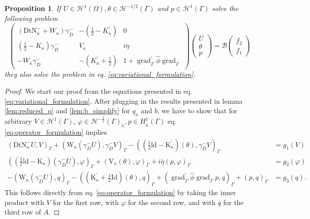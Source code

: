 \documentclass[12pt,journal,compsoc, onecolumn]{IEEEtran}
\newtheorem{proposition}[theorem]{Proposition}
\begin{document}
\begin{proposition}
\label{prop:operator_formulation}
If \(U \in \mathcal{H}^{1}(\Omega), \theta \in \mathcal{H}^{-1 / 2}(\Gamma)\) and \(p \in \mathcal{H}^{1}(\Gamma)\) solve the following problem 
    \begin{equation}
    \label{eq:operator_formulation}
        \begin{pmatrix}
            (\mathrm{DtN}_{ \kappa}^{-} + W_{ \kappa}) \gamma_D^- & - (\frac{1}{2} - K^\prime_{ \kappa}) & 0 \\
            (\frac{1}{2} - K_{ \kappa})\gamma_D^- & V_{ \kappa} & i \overline{\eta} \\
            - W_{ \kappa}\gamma_D^- & - (K^\prime_{ \kappa} + \frac{1}{2}) & 1 + \operatorname{grad}_{\Gamma}^\prime \hat{\phi}\operatorname{grad}_{\Gamma} 
        \end{pmatrix}
        \begin{pmatrix}
            U \\ \theta\\ p 
        \end{pmatrix}
        = \mathcal{B}\begin{pmatrix}
            f_2 \\ f_1
        \end{pmatrix}
    \end{equation}
    they also solve the problem in eq. \ref{eq:variational_formulation}.
\end{proposition}
\begin{proof}
    We start our proof from the equations presented in eq. \ref{eq:variational_formulation}. After plugging in the results presented in lemma \ref{lem:reduced_q} and \ref{lem:b_simplify} for $q_\kappa$ and $b$, we have to show that for arbitrary $V \in \mathcal{H}^1(\Gamma)$, $\varphi \in \mathcal{H}^{-\frac{1}{2}}(\Gamma)_{\tilde \kappa}, p \in H^{1}_{\tilde \kappa}(\Gamma)$ eq. \ref{eq:operator_formulation} implies 
    \begin{align}
        (\mathrm{DtN}_{ \kappa}^{-}U, V)_\Gamma +\left(\mathrm{W}_{\kappa}\left(\gamma_{D}^{-} U\right), \gamma_{D}^{-} V\right)_{\Gamma}-\left((\frac{1}{2} \mathrm{ld}-\mathrm{K}_{\kappa}^{\prime})(\theta), \gamma_{D}^{-} V\right)_{\Gamma} &=g_1(V) \nonumber \\
        \left((\frac{1}{2} \mathrm{ld}-\mathrm{K}_{\kappa})\left(\gamma_{D}^{-} U\right), \varphi\right)_{\Gamma}+\left(\mathrm{V}_{\kappa}(\theta), \varphi\right)_{\Gamma}+i \overline{\eta}(p, \varphi)_{\Gamma} &={g_2}(\varphi) \nonumber  \\
        -\left(\mathrm{W}_{\kappa}\left(\gamma_{D}^{-} U\right), q\right)_{\Gamma}-\left((\mathrm{K}_{\kappa}^{\prime}+\frac{1}{2} \mathrm{Id})(\theta), q\right)_{\Gamma} + (\operatorname{grad}_{\Gamma}^{\prime} \hat{\phi} \operatorname{grad}_{\Gamma}p, q)_\Gamma +(p, q)_{\Gamma} &=g_3(q). \nonumber
    \end{align}
    This follows directly from eq. \ref{eq:operator_formulation} by taking the inner product with $V$ for the first row, with $\varphi$ for the second row, and with $q$ for the third row of $A$.
\end{proof}  \noindent
\end{document}
